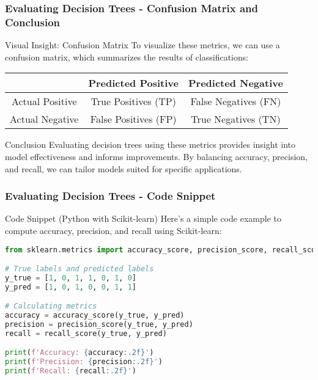 \documentclass[aspectratio=169]{beamer}
\begin{document}
\begin{frame}[fragile]
    \frametitle{Evaluating Decision Trees - Confusion Matrix and Conclusion}
    \begin{block}{Visual Insight: Confusion Matrix}
        To visualize these metrics, we can use a confusion matrix, which summarizes the results of classifications:
        \begin{table}[]
        \centering
        \begin{tabular}{|c|c|c|}
        \hline
                          & Predicted Positive & Predicted Negative \\ \hline
        Actual Positive    & True Positives (TP) & False Negatives (FN) \\ \hline
        Actual Negative    & False Positives (FP) & True Negatives (TN)  \\ \hline
        \end{tabular}
        \end{table}
    \end{block}

    \begin{block}{Conclusion}
        Evaluating decision trees using these metrics provides insight into model effectiveness and informs improvements. By balancing accuracy, precision, and recall, we can tailor models suited for specific applications.
    \end{block}
\end{frame}

\begin{frame}[fragile]
    \frametitle{Evaluating Decision Trees - Code Snippet}
    \begin{block}{Code Snippet (Python with Scikit-learn)}
        Here’s a simple code example to compute accuracy, precision, and recall using Scikit-learn:
        \begin{lstlisting}[language=Python]
from sklearn.metrics import accuracy_score, precision_score, recall_score

# True labels and predicted labels
y_true = [1, 0, 1, 1, 0, 1, 0]
y_pred = [1, 0, 1, 0, 0, 1, 1]

# Calculating metrics
accuracy = accuracy_score(y_true, y_pred)
precision = precision_score(y_true, y_pred)
recall = recall_score(y_true, y_pred)

print(f'Accuracy: {accuracy:.2f}')
print(f'Precision: {precision:.2f}')
print(f'Recall: {recall:.2f}')
        \end{lstlisting}
    \end{block}
\end{frame}
\end{document}
